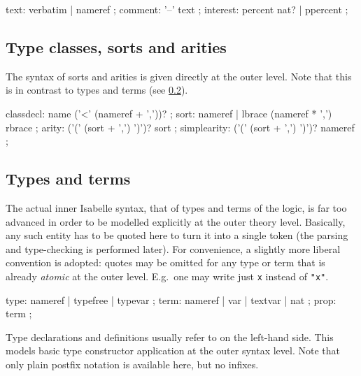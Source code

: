 \begin{rail}
  text: verbatim | nameref
  ;
  comment: '--' text
  ;
  interest: percent nat? | ppercent
  ;
\end{rail}


\subsection{Type classes, sorts and arities}

The syntax of sorts and arities is given directly at the outer level.  Note
that this is in contrast to types and terms (see \ref{sec:types-terms}).

\begin{rail}
  classdecl: name ('<' (nameref + ','))?
  ;
  sort: nameref | lbrace (nameref * ',') rbrace
  ;
  arity: ('(' (sort + ',') ')')? sort
  ;
  simplearity: ('(' (sort + ',') ')')? nameref
  ;
\end{rail}


\subsection{Types and terms}\label{sec:types-terms}

The actual inner Isabelle syntax, that of types and terms of the logic, is far
too advanced in order to be modelled explicitly at the outer theory level.
Basically, any such entity has to be quoted here to turn it into a single
token (the parsing and type-checking is performed later).  For convenience, a
slightly more liberal convention is adopted: quotes may be omitted for any
type or term that is already \emph{atomic} at the outer level.  E.g.\ one may
write just \texttt{x} instead of \texttt{"x"}.

\begin{rail}
  type: nameref | typefree | typevar
  ;
  term: nameref | var | textvar | nat
  ;
  prop: term
  ;
\end{rail}

Type declarations and definitions usually refer to  on
the left-hand side.  This models basic type constructor application at the
outer syntax level.  Note that only plain postfix notation is available here,
but no infixes.


